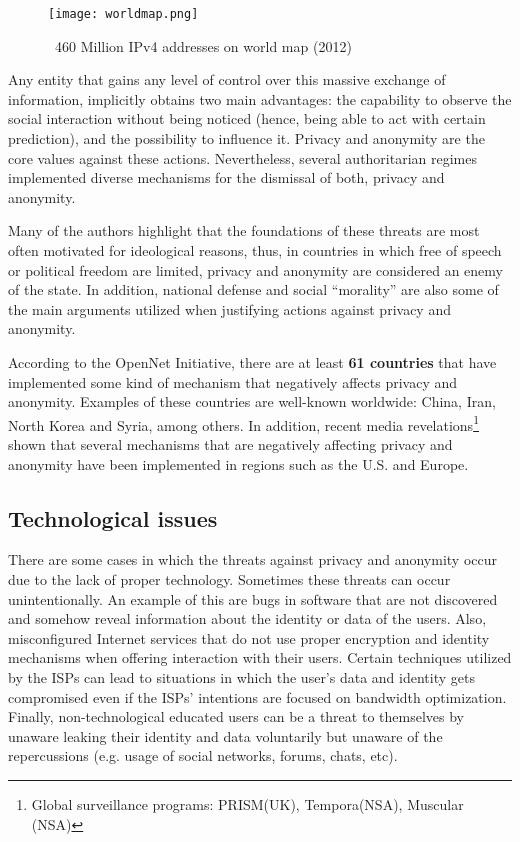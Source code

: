 \documentclass[conference]{IEEEtran}
\begin{document}
\begin{figure}[h]
  \centering
  \captionsetup{justification=centering}
  \texttt{[image: worldmap.png]}
  \caption{~460 Million IPv4 addresses on world map (2012)\cite{CENSUS}}
\end{figure}

Any entity that gains any level of control over this massive exchange
of information, implicitly obtains two main  advantages: the capability to
observe the social interaction without being noticed (hence, being
able to act with certain prediction), and the possibility
to influence it. Privacy and anonymity are the core values against
these actions. Nevertheless, several authoritarian regimes implemented
diverse mechanisms for the dismissal of both, privacy and anonymity.

Many of the authors
highlight that the foundations of these threats are most often
motivated for ideological reasons\cite{taxo}, thus, in countries in
which free of speech or political freedom are limited, privacy and
anonymity are considered an enemy of the state. In addition, national
defense and social ``morality'' are also some of the main arguments
utilized when justifying actions against privacy and anonymity\cite{ACCESS}.

According to the OpenNet Initiative\cite{OPENNET}, there are at
least \textbf{61 countries} that have implemented some kind of
mechanism that negatively affects privacy and anonymity. Examples of these countries are
well-known worldwide: China\cite{GFC}, Iran\cite{IRAN}, North Korea and Syria, among
others. In addition, recent media revelations\footnote{Global
  surveillance programs: PRISM(UK), Tempora(NSA), Muscular (NSA)} shown that several
mechanisms that are negatively affecting privacy and anonymity have been
implemented in regions such as the U.S. and Europe.

\subsection{Technological issues}

There are some cases in which the threats against privacy and
anonymity occur due to the lack of proper technology. Sometimes these
threats can occur unintentionally. An example of this are bugs in
software that are not discovered and somehow reveal information about
the identity or data of the users. Also, misconfigured Internet services that do
not use proper encryption and identity mechanisms when offering
interaction with their users. Certain techniques utilized by
the ISPs can lead to situations in which the user's data and identity gets
compromised even if the ISPs' intentions are focused on bandwidth
optimization. Finally, non-technological educated users can be a
threat to themselves by unaware leaking their identity and data
voluntarily but unaware of the repercussions (e.g. usage of social networks, forums, chats, etc).
\end{document}

